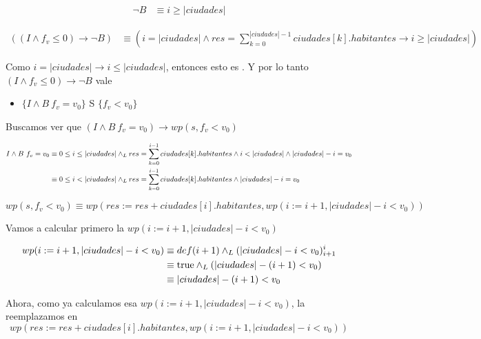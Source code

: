 \documentclass[10pt,a4paper]{article}
\begin{document}
\begin {enumerate}
    \begin{align*}
        \neg B &\equiv i \geq |ciudades|
    \end{align*}


    \begin{align*}
        ((I \land f_{v} \leq 0) \to \neg B) &\equiv (i = |ciudades| \land res = \sum\limits_{k=0}^{|ciudades| -1}{ciudades[k].habitantes} \to i \geq |ciudades|)
    \end{align*}

    Como $i = |ciudades| \to i \leq |ciudades|$, entonces esto es \True . Y por lo tanto $(I \land f_{v} \leq 0) \to \neg B $ vale

    \begin{itemize}
        \item 
            $\{ I \land B \ f_{v} = v_{0}  \}$ S $\{f_{v} < v_{0}\}$
    \end{itemize}
    
    Buscamos ver que  $(I \land B \ f_{v} = v_{0}) \to wp(s, f_{v} < v_{0}) $

    \begin{align*}
        I \land B \ f_{v} = v_{0} &\equiv 0 \leq i \leq |ciudades| \land _L res = \sum\limits_{k=0}^{i - 1}{ciudades[k].habitantes} \land i < |ciudades| \land |ciudades| - i = v_{0} \\
            &\equiv 0 \leq i < |ciudades| \land _L res = \sum\limits_{k=0}^{i - 1}{ciudades[k].habitantes} \land |ciudades| - i = v_{0}
    \end{align*}

    $$wp(s, f_{v}<v_{0}) \equiv  wp(res := res + ciudades[i].habitantes, wp(i := i +1, |ciudades| - i < v_{0}))$$

    Vamos a calcular primero la $wp(i := i +1, |ciudades| - i < v_{0}) $
    
    \begin{align*}
        wp(i := i +1, |ciudades| - i < v_{0}) &\equiv def (i + 1) \land _L (|ciudades| - i < v_{0})_{i + 1}^{i} \\
        &\equiv \mathrm{true} \land _L (|ciudades| - (i + 1) < v_{0}) \\
        &\equiv |ciudades| - (i + 1) < v_{0}
    \end{align*}

    Ahora, como ya calculamos esa $wp(i := i +1, |ciudades| - i < v_{0}) $, la reemplazamos en  \\
    $$ wp(res := res + ciudades[i].habitantes, wp(i := i +1, |ciudades| - i < v_{0}))$$


\end{enumerate}
\end{document}
